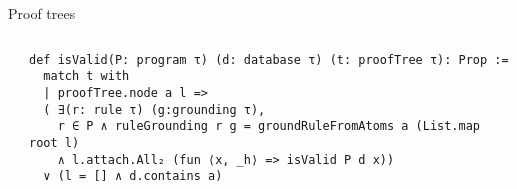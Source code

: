 \documentclass[aspectratio=169]{beamer}
\begin{document}
    \begin{frame}[fragile]{Proof trees}
        \begin{columns}
            \begin{column}{0.3\textwidth}

       
            \end{column}
            \begin{column}{0.5\textwidth}
                \begin{lstlisting}
def isValid(P: program τ) (d: database τ) (t: proofTree τ): Prop :=
  match t with
  | proofTree.node a l => 
  ( ∃(r: rule τ) (g:grounding τ),
    r ∈ P ∧ ruleGrounding r g = groundRuleFromAtoms a (List.map root l) 
    ∧ l.attach.All₂ (fun ⟨x, _h⟩ => isValid P d x)) 
  ∨ (l = [] ∧ d.contains a)
                \end{lstlisting}
            \end{column}
        \end{columns}
    \end{frame}
\end{document}
